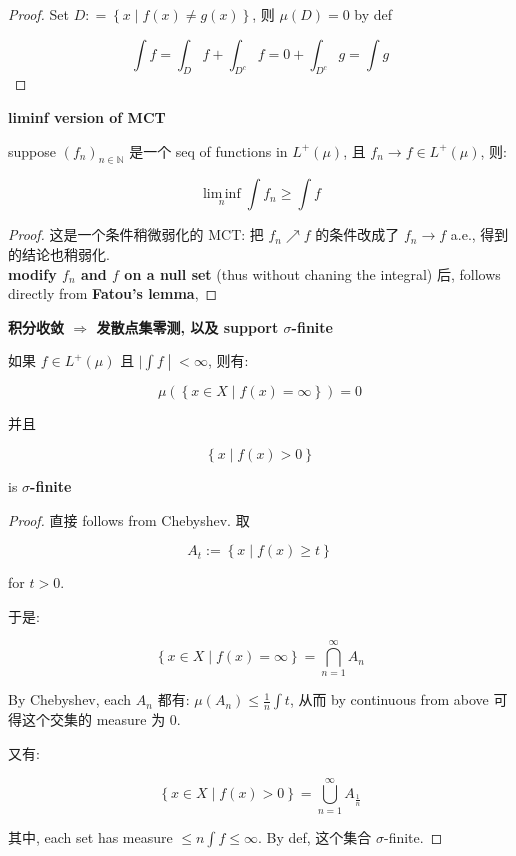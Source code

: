 \documentclass{qlnotes-export}
\begin{document}
\begin{proof}

Set \(D: = \left\{ {x \mid f(x) \neq g(x)} \right\}\), 则 \(\mu(D) = 0\) by def

\[\int f = \int_{D}f + \int_{D^{c}}f = 0 + \int_{D^{c}}g = \int g\]

\end{proof}

\begin{corollary}{\protect{}\label{kn-liminf-version-of-mct}{\textbf{liminf
version of MCT}}}

suppose \((f_{n})_{n \in {\mathbb{N}}}\) 是一个 seq of functions in \(L^{+}(\mu)\), 且 \(f_{n}\rightarrow f \in L^{+}(\mu)\), 则:

\[\operatorname{lim\, inf}\limits_{n}\int f_{n} \geq \int f\]

\end{corollary}

\begin{proof}

这是一个条件稍微弱化的 MCT: 把 \(f_{n}\operatorname{\nearrow ︎}f\) 的条件改成了 \(f_{n}\rightarrow f\) a.e., 得到的结论也稍弱化.\\
\textbf{modify \(f_{n}\) and \(f\) on a null set} (thus without chaning the integral) 后, follows directly from \textbf{Fatou's lemma},

\end{proof}

\begin{theorem}{\protect{}\label{kn-implies-support-sigma-finite}{\textbf{积分收敛
\(\Longrightarrow\) 发散点集零测, 以及 support \(\sigma\)-finite}}}

如果 \(f \in L^{+}(\mu)\) 且 \(\left. |\int f \middle| < \infty \right.\), 则有:

\[\mu(\left\{ {x \in X \mid f(x) = \infty} \right\}) = 0\]

并且

\[\left\{ {x \mid f(x) > 0} \right\}\]

is \textbf{\(\sigma\)-finite}

\end{theorem}

\begin{proof}

直接 follows from Chebyshev. 取

\[A_{t} := \left\{ {x \mid f(x) \geq t} \right\}\]

for \(t > 0\).

于是:

\[\left\{ {x \in X \mid f(x) = \infty} \right\} = \bigcap\limits_{n = 1}^{\infty}A_{n}\]

By Chebyshev, each \(A_{n}\) 都有: \(\mu(A_{n}) \leq \frac{1}{n}\int t\), 从而 by continuous from above 可得这个交集的 measure 为 0.

又有:

\[\left\{ {x \in X \mid f(x) > 0} \right\} = \bigcup\limits_{n = 1}^{\infty}A_{\frac{1}{n}}\]

其中, each set has measure \(\leq n\int f \leq \infty\). By def, 这个集合 \(\sigma\)-finite.

\end{proof}
\end{document}
